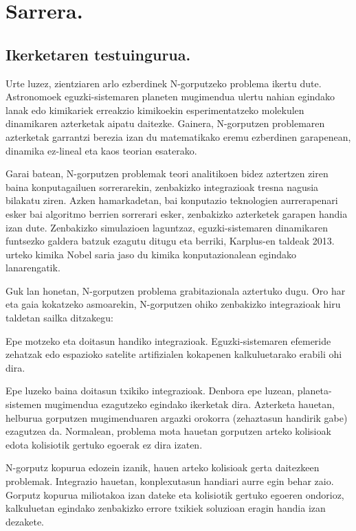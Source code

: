 \chapter{Sarrera.}


\section{Ikerketaren testuingurua.}

Urte luzez, zientziaren arlo ezberdinek N-gorputzeko problema ikertu dute. Astronomoek eguzki-sistemaren planeten mugimendua ulertu nahian egindako lanak edo kimikariek erreakzio kimikoekin esperimentatzeko molekulen dinamikaren azterketak aipatu daitezke. Gainera,  N-gorputzen problemaren azterketak garrantzi berezia izan du matematikako eremu ezberdinen garapenean,  dinamika ez-lineal eta kaos teorian esaterako. 

Garai batean, N-gorputzen problemak teori analitikoen bidez aztertzen ziren baina konputagailuen sorrerarekin, zenbakizko integrazioak tresna nagusia bilakatu ziren. Azken hamarkadetan, bai konputazio teknologien aurrerapenari esker bai algoritmo berrien sorrerari esker, zenbakizko azterketek garapen handia izan dute. Zenbakizko simulazioen laguntzaz, eguzki-sistemaren dinamikaren funtsezko galdera batzuk ezagutu ditugu eta berriki, Karplus-en taldeak 2013. urteko kimika Nobel saria \cite{Karplus2014} jaso du kimika konputazionalean egindako lanarengatik.       

Guk lan honetan, N-gorputzen problema grabitazionala aztertuko dugu. Oro har eta gaia kokatzeko asmoarekin, N-gorputzen ohiko zenbakizko  integrazioak hiru taldetan sailka ditzakegu:
\begin{enumerate}
{
\item Epe motzeko eta doitasun handiko integrazioak. 
 Eguzki-sistemaren efemeride zehatzak \cite{Folkner2014} edo espazioko satelite artifizialen kokapenen \cite{Beylkin2014} kalkuluetarako erabili ohi dira.
\item Epe luzeko baina doitasun txikiko integrazioak.
 Denbora epe luzean, planeta-sistemen mugimendua ezagutzeko egindako ikerketak dira. Azterketa hauetan, helburua gorputzen mugimenduaren argazki orokorra (zehaztasun handirik gabe) ezagutzea da. Normalean, problema mota hauetan gorputzen arteko kolisioak edota kolisiotik gertuko egoerak ez dira izaten.     
\item N-gorputz kopurua edozein izanik, hauen arteko kolisioak gerta daitezkeen problemak.
 Integrazio hauetan, konplexutasun handiari aurre egin behar zaio. Gorputz kopurua miliotakoa \cite{Ishiyama2012} izan dateke eta kolisiotik gertuko egoeren ondorioz, kalkuluetan egindako zenbakizko errore txikiek soluzioan eragin handia izan dezakete.    
}
\end{enumerate}

